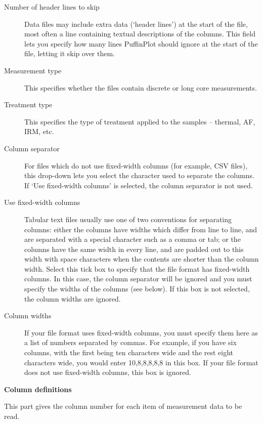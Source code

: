 \documentclass[a4paper,british]{article}
\newcommand{\mypara}[1]{\noindent\textbf{#1}

\noindent\ignorespaces} %
\begin{document}
\begin{description}

\item[Number of header lines to skip] Data files may include extra data
  (`header lines') at the start of the file, most often a line containing
  textual descriptions of the columns. This field lets you specify how many
  lines PuffinPlot should ignore at the start of the file, letting it
  skip over them.

\item[Measurement type] This specifies whether the files contain discrete
  or long core measurements.

\item[Treatment type] This specifies the type of treatment applied to
  the samples -- thermal, AF, IRM, etc.

\item[Column separator] For files which do not use fixed-width columns (for
  example, CSV files), this drop-down lets you select the character used
  to separate the columns. If `Use fixed-width columns' is selected, the
  column separator is not used.

\item[Use fixed-width columns] Tabular text files usually use one of two
  conventions for separating columns: either the columns have widths which
  differ from line to line, and are separated with a special character such
  as a comma or tab; or the columns have the same width in every line, and
  are padded out to this width with space characters when the contents are
  shorter than the column width. Select this tick box to specify that the
  file format has fixed-width columns. In this case, the column separator will
  be ignored and you must specify the widths of the columns (see below).
  If this box is not selected, the column widths are ignored.

\item[Column widths] If your file format uses fixed-width columns, you must
  specify them here as a list of numbers separated by commas. For example, if
  you have six columns, with the first being ten characters wide and the rest
  eight characters wide, you would enter 10,8,8,8,8,8 in this box. If your
  file format does not use fixed-width columns, this box is ignored.

\end{description}

\mypara{Column definitions} This part gives the column number for each
item of measurement data to be read.
\end{document}
